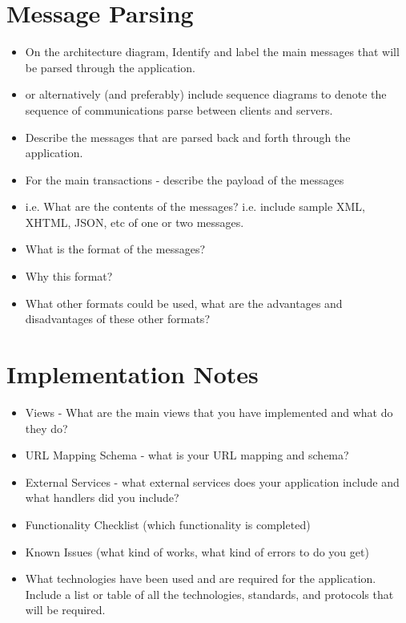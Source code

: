 \documentclass{sig-alt-release2}
\begin{document}
\section{Message Parsing}
\begin{itemize}

\item	On the architecture diagram, Identify and label the main messages that will be parsed through the application.
\item	or alternatively (and preferably) include sequence diagrams to denote the sequence of communications parse between clients and servers.
\item	Describe the messages that are parsed back and forth through the application.
\item	For the main transactions - describe the payload of the messages 
\item	i.e. What are the contents of the messages? i.e. include sample XML, XHTML, JSON, etc of one or two messages.
\item	What is the format of the messages? 
\item	Why this format? 
\item	What other formats could be used, what are the advantages and disadvantages of these other formats?
\end{itemize}




\section{Implementation Notes}
\label{sec: implementation}

\begin{itemize}
\item Views - What are the main views that you have implemented and what do they do?
\item URL Mapping Schema - what is your URL mapping and schema?
\item External Services  - what external services does your application include and what handlers did you include?
\item	Functionality Checklist (which functionality is completed)
\item	Known Issues (what kind of works, what kind of errors to do you get)
\item What technologies have been used and are required for the application. Include a list or table of all the technologies, standards, and protocols that will be required.
\end{itemize}
\end{document}
